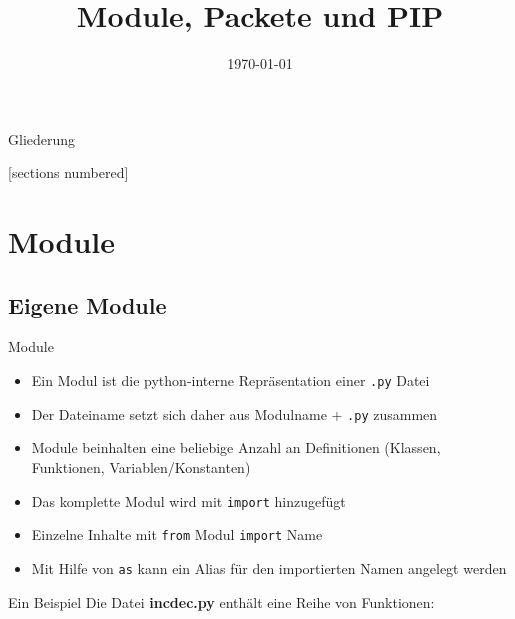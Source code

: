 



\title{Module, Packete und PIP}
\date{\today}




\maketitle

\begin{frame}{Gliederung}
	\begin{multicols}{2}
		[sections numbered]
		\tableofcontents
	\end{multicols}
\end{frame}


\section{Module}
\subsection{Eigene Module}
\begin{frame}[fragile]{Module}
	\begin{itemize}
		\item Ein Modul ist die python-interne Repr\"asentation einer \texttt{.py} Datei
		\item Der Dateiname setzt sich daher aus Modulname + \texttt{.py} zusammen
		\item Module beinhalten eine beliebige Anzahl an Definitionen (Klassen, Funktionen, Variablen/Konstanten)
		\item Das komplette Modul wird mit \alert{\texttt{import}} hinzugef\"ugt
		\item Einzelne Inhalte mit \alert{\texttt{from}} Modul \alert{\texttt{import}} Name
		\item Mit Hilfe von \alert{\texttt{as}} kann ein Alias f\"ur den importierten Namen angelegt werden
	\end{itemize}
\end{frame}

\begin{frame}{Ein Beispiel}
	Die Datei \textbf{incdec.py} enth\"alt eine Reihe von Funktionen:
	
\end{frame}

